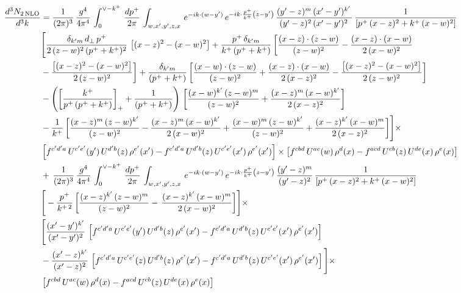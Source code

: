 \documentclass[9pt]{article}
\numberwithin{equation}{section}
\begin{document}
{\begin{align*}
\frac{d^{3}N_{2\,\rm NLO}}{d^{3}k} & = \frac{1}{(2\pi)^{3}}\,\frac{g^{4}}{4\pi^{4}}\,\int_{0}^{\vee - k^{+}}\, \frac{dp^{+}}{2\pi}\,\int_{w,x',y',z,x}\, e^{-ik\cdot (w-y')}\,e^{-ik\cdot \frac{p^{+}}{k^{+}}\left(z-y'\right)}\, \frac{(y'-z)^{m}\,(x'-y')^{k'}\,}{(y'-z)^{2}\,(x'-y')^{2}\,}\, \frac{1}{\left[p^{+}\,(x-z)^{2}+k^{+}\,(x-w)^{2}\right]}\notag \\ & \Bigg[\frac{\delta_{k'm}\,d_{\perp}\,p^{+}}{2\,(z-w)^{2}\,(p^{+}+k^{+})^{2}}\, \left[(x-z)^{2}-(x-w)^{2}\right]+\frac{p^{+}\,\delta_{k'm}}{k^{+}\,(p^{+}+k^{+})}\,\bigg[\frac{(x-z)\cdot (z-w)}{(z-w)^{2}} -\frac{(x-z)\cdot (x-w)}{2\,(x-w)^{2}}\notag \\ & -\frac{\left[(x-z)^{2}-(x-w)^{2}\right]}{2\,(z-w)^{2}}\bigg] +\frac{\delta_{k'm}}{(p^{+}+k^{+})}\,\bigg[\frac{(x-w)\cdot (z-w)}{(z-w)^{2}}+\frac{(x-z)\cdot (x-w)}{2\,(x-z)^{2}} -\frac{\left[(x-z)^{2}-(x-w)^{2}\right]}{2\,(z-w)^{2}}\bigg]\notag \\ &-\left(\left[\frac{k^{+}}{p^{+}\,(p^{+}+k^{+})}\right]_{+}+\frac{1}{(p^{+}+k^{+})}\right)\,\bigg[\frac{(x-w)^{k'}\,(z-w)^{m}}{(z-w)^{2}}+\frac{(x-z)^{m}\,(x-w)^{k'}}{2\,(x-z)^{2}}\bigg]\notag \\ & -\frac{1}{k^{+}}\,\bigg[\frac{(x-z)^{m}\,(z-w)^{k'}}{(z-w)^{2}}-\frac{(x-z)^{m}\,(x-w)^{k'}}{2\,(x-w)^{2}}+\frac{(x-w)^{m}\,(z-w)^{k'}}{(z-w)^{2}} +\frac{(x-z)^{k'}\,(x-w)^{m}}{2\,(x-z)^{2}}\bigg]\Bigg]\times\,\notag \\ & \left[f^{c'd'a}\,U^{c'e'}(y')\,U^{d'b}(z)\,\rho^{e'}(x')-f^{c'd'a}\, 
    U^{d'b}(z)\,U^{c'e'}(x')\,\rho^{e'}(x')\right]\times \left[f^{cbd}\,U^{ac}(w)\,\rho^{d}(x) -f^{acd}\,U^{cb}(z)\,U^{de}(x)\,\rho^{e}(x)\right] \notag \\ & +\,\frac{1}{(2\pi)^{3}}\,\frac{g^{4}}{4\pi^{4}}\,\int_{0}^{\vee - k^{+}}\, \frac{dp^{+}}{2\pi}\,\int_{w,x',y',z,x}\, e^{-ik\cdot (w-y')}\,e^{-ik\cdot \frac{p^{+}}{k^{+}}\left(z-y'\right)}\, \frac{(y'-z)^{m}}{(y'-z)^{2}}\, \frac{1}{\left[p^{+}\,(x-z)^{2}+k^{+}\,(x-w)^{2}\right]}\notag \\ & \Bigg[ -\frac{p^{+}}{k^{+\,2}}\,\bigg[\frac{(x-z)^{k'}\,(z-w)^{m}}{(z-w)^{2}} -\,\frac{(x-z)^{k'}\,(x-w)^{m}}{2\,(x-w)^{2}}\bigg] \Bigg]\times\,\notag \\ & \Bigg[\frac{(x'-y')^{k'}}{(x'-y')^{2}}\,\left[f^{c'd'a}\,U^{c'e'}(y')\,U^{d'b}(z)\,\rho^{e'}(x')-f^{c'd'a}\, 
    U^{d'b}(z)\,U^{c'e'}(x')\,\rho^{e'}(x')\right]\notag \\ & -\frac{(x'-z)^{k'}}{(x'-z)^{2}}\,\left[f^{c'd'a}\,U^{c'e'}(z)\,U^{d'b}(z)\,\rho^{e'}(x')-f^{c'd'a}\, 
    U^{d'b}(z)\,U^{c'e'}(x')\,\rho^{e'}(x')\right]\Bigg]\times \notag \\ & \left[f^{cbd}\,U^{ac}(w)\,\rho^{d}(x) -f^{acd}\,U^{cb}(z)\,U^{de}(x)\,\rho^{e}(x)\right] \notag \\

\end{align*}}
\end{document}
